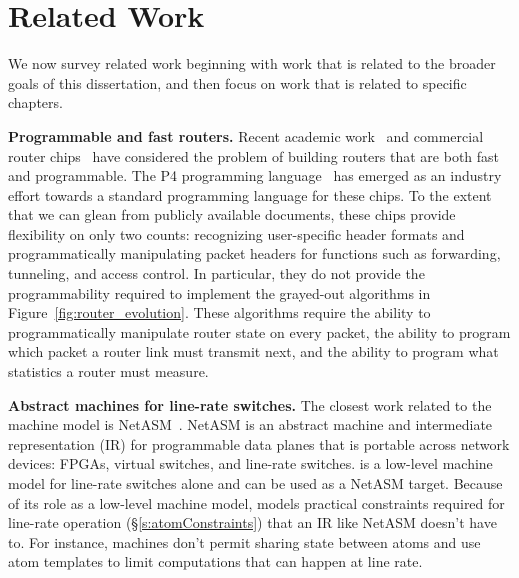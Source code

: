 \chapter{Related Work}
\label{chap:related}

We now survey related work beginning with work that is related to the broader
goals of this dissertation, and then focus on work that is related to specific
chapters.

\medskip
\noindent
\textbf{Programmable and fast routers.}
Recent academic work~\cite{rmt} and commercial router chips~\cite{tofino,
flexpipe, xpliant} have considered the problem of building routers that are
both fast and programmable. The P4 programming language~\cite{p4} has emerged
as an industry effort towards a standard programming language for these chips.
To the extent that we can glean from publicly available documents, these chips
provide flexibility on only two counts: recognizing user-specific header
formats and programmatically manipulating packet headers for functions such as
forwarding, tunneling, and access control. In particular, they do not provide
the programmability required to implement the grayed-out algorithms in
Figure~\ref{fig:router_evolution}.  These algorithms require the ability to
programmatically manipulate router state on every packet, the ability to
program which packet a router link must transmit next, and the ability to
program what statistics a router must measure.

\medskip
\noindent
\textbf{Abstract machines for line-rate switches.}
The closest work related to the \absmachine machine model is
NetASM~\cite{netasm}. NetASM is an abstract machine and intermediate
representation (IR) for programmable data planes that is portable across
network devices: FPGAs, virtual switches, and line-rate switches.  \absmachine
is a low-level machine model for line-rate switches alone and can be used as a
NetASM target. Because of its role as a low-level machine model, \absmachine
models practical constraints required for line-rate operation
(\S\ref{s:atomConstraints}) that an IR like NetASM doesn't have to. For
instance, \absmachine machines don't permit sharing state between atoms and use
atom templates to limit computations that can happen at line rate.

